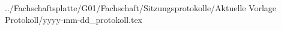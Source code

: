 ../Fachschaftsplatte/G01/Fachschaft/Sitzungsprotokolle/Aktuelle Vorlage Protokoll/yyyy-mm-dd_protokoll.tex